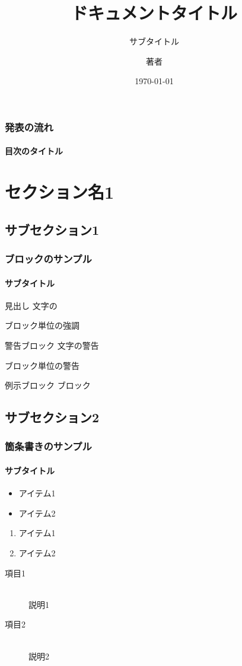 \documentclass[aspectratio=169,cjk]{beamer} %
\title[短縮形]{ドキュメントタイトル}
\subtitle{サブタイトル}
\author{著者}
\institute[所属短縮系]{所属}
\date[短縮形]{\today}
\begin{document}
\begin{frame}[plain]
 \titlepage
\end{frame}

\begin{frame}[t] %
 \frametitle{発表の流れ}
 \framesubtitle{目次のタイトル}
 \tableofcontents %
\end{frame}

\section[セクション名短縮系1]{セクション名1}
\subsection[セクション名短縮系1-1]{サブセクション1}

\begin{frame}
 \frametitle{ブロックのサンプル}
 \framesubtitle{サブタイトル}

 \begin{block}{見出し}
  文字の

  \begin{structureenv}
   ブロック単位の強調
  \end{structureenv}
 \end{block}

 \begin{alertblock}{警告ブロック}
  文字の\alert{警告}

  \begin{alertenv}
   ブロック単位の警告
  \end{alertenv}
 \end{alertblock}

 \begin{exampleblock}{例示ブロック}
  ブロック
 \end{exampleblock}

\end{frame}

\subsection[セクション名短縮系1-2]{サブセクション2}
\begin{frame}
 \frametitle{箇条書きのサンプル}
 \framesubtitle{サブタイトル}
 \begin{itemize}
  \item アイテム1
  \item アイテム2
 \end{itemize}
 \pause
 \begin{enumerate}
  \item アイテム1
  \item アイテム2
 \end{enumerate}
 \pause
 \begin{description}
  \item[項目1] \mbox{} \\
			 説明1
  \item[項目2] \mbox{} \\
			 説明2
 \end{description}
\end{frame}
\end{document}
